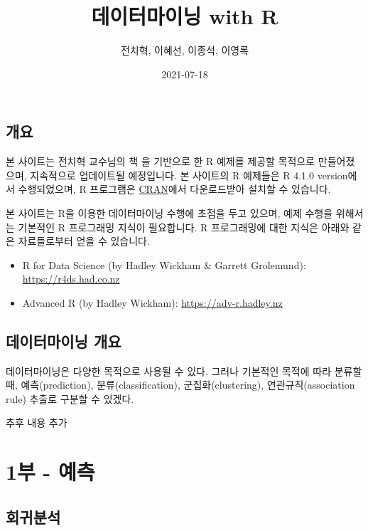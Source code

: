 \documentclass[
]{book}
\title{데이터마이닝 with R}
\author{전치혁, 이혜선, 이종석, 이영록}
\date{2021-07-18}
\providecommand{\tightlist}{%
  \setlength{\itemsep}{0pt}\setlength{\parskip}{0pt}}
\begin{document}
\maketitle

{
\setcounter{tocdepth}{1}
\tableofcontents
}
\hypertarget{uxac1cuxc694}{%
\chapter*{개요}\label{uxac1cuxc694}}

본 사이트는 전치혁 교수님의 책 \href{http://www.hannarae.net/books/area.php?ptype=view\&prdcode=1409250010}{}을 기반으로 한 R 예제를 제공할 목적으로 만들어졌으며, 지속적으로 업데이트될 예정입니다. 본 사이트의 R 예제들은 R 4.1.0 version에서 수행되었으며, R 프로그램은 \href{https://cran.r-project.org}{CRAN}에서 다운로드받아 설치할 수 있습니다.

본 사이트는 R을 이용한 데이터마이닝 수행에 초점을 두고 있으며, 예제 수행을 위해서는 기본적인 R 프로그래밍 지식이 필요합니다. R 프로그래밍에 대한 지식은 아래와 같은 자료들로부터 얻을 수 있습니다.

\begin{itemize}
\tightlist
\item
  R for Data Science (by Hadley Wickham \& Garrett Grolemund): \url{https://r4ds.had.co.nz}
\item
  Advanced R (by Hadley Wickham): \url{https://adv-r.hadley.nz}
\end{itemize}

\hypertarget{datamining-overview}{%
\chapter{데이터마이닝 개요}\label{datamining-overview}}

데이터마이닝은 다양한 목적으로 사용될 수 있다. 그러나 기본적인 목적에 따라 분류할 때, 예측(prediction), 분류(classification), 군집화(clustering), 연관규칙(association rule) 추출로 구분할 수 있겠다.

추후 내용 추가

\hypertarget{part-1uxbd80---uxc608uxce21}{%
\part{1부 - 예측}\label{part-1uxbd80---uxc608uxce21}}

\hypertarget{regression}{%
\chapter{회귀분석}\label{regression}}
\end{document}

